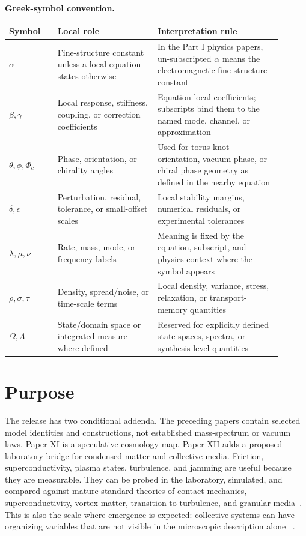 \documentclass[11pt]{article}
\begin{document}
\noindent\textbf{Greek-symbol convention.}
\begin{center}
{\small
\begin{tabular}{L{0.16\linewidth}L{0.33\linewidth}L{0.41\linewidth}}
\hline
Symbol & Local role & Interpretation rule \\
\hline
$\alpha$ & Fine-structure constant unless a local equation states otherwise & In the Part I physics papers, un-subscripted $\alpha$ means the electromagnetic fine-structure constant \\
$\beta,\gamma$ & Local response, stiffness, coupling, or correction coefficients & Equation-local coefficients; subscripts bind them to the named mode, channel, or approximation \\
$\theta,\phi,\Phi_c$ & Phase, orientation, or chirality angles & Used for torus-knot orientation, vacuum phase, or chiral phase geometry as defined in the nearby equation \\
$\delta,\epsilon$ & Perturbation, residual, tolerance, or small-offset scales & Local stability margins, numerical residuals, or experimental tolerances \\
$\lambda,\mu,\nu$ & Rate, mass, mode, or frequency labels & Meaning is fixed by the equation, subscript, and physics context where the symbol appears \\
$\rho,\sigma,\tau$ & Density, spread/noise, or time-scale terms & Local density, variance, stress, relaxation, or transport-memory quantities \\
$\Omega,\Lambda$ & State/domain space or integrated measure where defined & Reserved for explicitly defined state spaces, spectra, or synthesis-level quantities \\
\hline
\end{tabular}
}
\end{center}

\section{Purpose}

The release has two conditional addenda. The preceding papers contain selected
model identities and constructions, not established mass-spectrum or vacuum
laws. Paper XI is a speculative cosmology map. Paper XII adds a proposed
laboratory bridge for condensed matter and
collective media. Friction, superconductivity, plasma states, turbulence, and
jamming are useful because they are measurable. They can be probed in the
laboratory, simulated, and compared against mature standard theories of contact
mechanics, superconductivity, vortex matter, transition to turbulence, and
granular media~\cite{BowdenTabor1950,BCS1957,Abrikosov1957,Reynolds1883,JaegerNagelBehringer1996}.
This is also the scale where emergence is expected: collective systems can have
organizing variables that are not visible in the microscopic description alone
~\cite{Anderson1972}.
\end{document}
